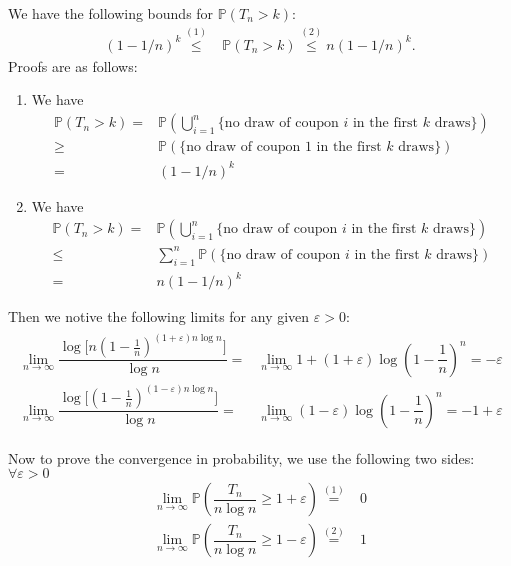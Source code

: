 \documentclass[11pt,a4paper]{article}
\numberwithin{equation}{section}%
\begin{document}
We have the following bounds for $ \mathbb{P}\left( T_n > k \right)  $:
\begin{align*}
    (1-1/n)^k \mathop{ \leq  }\limits^{(1)}  & \mathbb{P}\left( T_n > k \right) \mathop{ \leq  }\limits^{(2)} n(1-1/n)^{k} .
\end{align*}
Proofs are as follows:
\begin{enumerate}[topsep=2pt,itemsep=2pt]
    \item We have
    \begin{align*}
        \mathbb{P}\left( T_n > k \right)= &\mathbb{P}\left( \bigcup _{i=1}^n \big\{ \text{no draw of coupon }i\text{ in the first }k\text{ draws} \big\} \right) \\
        \geq & \mathbb{P}\left(  \big\{ \text{no draw of coupon }1\text{ in the first }k\text{ draws} \big\} \right) \\
        = & \left( 1-1/n \right)^k
    \end{align*}
    \item We have
    \begin{align*}
        \mathbb{P}\left( T_n > k \right)= &\mathbb{P}\left( \bigcup _{i=1}^n \big\{ \text{no draw of coupon }i\text{ in the first }k\text{ draws} \big\} \right) \\
        \leq & \sum_{i=1}^n \mathbb{P}\left( \big\{ \text{no draw of coupon }i\text{ in the first }k\text{ draws} \big\} \right) \\
        = & n\left( 1-1/n \right)^k
    \end{align*}
\end{enumerate}

Then we notive the following limits for any given $ \varepsilon  >0 $:
\begin{align}\label{eq:1}
    \begin{aligned}
        \lim_{n\to\infty } \dfrac{ \log \big[ n(1-\frac{1}{n})^{(1+\varepsilon  )n\log n} \big] }{ \log n } =& \lim_{n\to\infty } 1 + (1+\varepsilon  )\log \left( 1-\dfrac{ 1 }{ n }  \right)^n = -\varepsilon  \\
    \lim_{n\to\infty } \dfrac{ \log \big[ (1-\frac{1}{n})^{(1-\varepsilon  )n\log n} \big] }{ \log n } =& \lim_{n\to\infty } (1-\varepsilon  )\log \left( 1-\dfrac{ 1 }{ n }  \right)^n = -1+\varepsilon 
    \end{aligned}
\end{align}

Now to prove the convergence in probability, we use the following two sides: $ \forall \varepsilon >0 $
\begin{align*}
    \lim_{n\to\infty} \mathbb{P}\left( \dfrac{ T_n  }{ n\log n } \mathop{ \geq  } 1+\varepsilon   \right) \mathop{ = }\limits^{(1)} &0  \\
    \lim_{n\to\infty} \mathbb{P}\left( \dfrac{ T_n  }{ n\log n } \mathop{ \geq } 1-\varepsilon   \right)  \mathop{ = }\limits^{(2)} &1
\end{align*}
\end{document}

